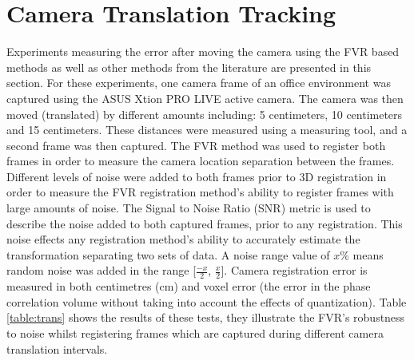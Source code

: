 \section{Camera Translation Tracking}
\label{Sec:CamTransTrackExp}

Experiments measuring the error after moving the camera using the FVR based methods as well as other methods from the literature are presented in this section. For these experiments, one camera frame of an office environment was captured using the ASUS Xtion PRO LIVE active camera. The camera was then moved (translated) by different amounts including: 5 centimeters, 10 centimeters and 15 centimeters. These distances were measured using a measuring tool, and a second frame was then captured. The FVR method was used to register both frames in order to measure the camera location separation between the frames. \\

Different levels of noise were added to both frames prior to 3D registration in order to measure the FVR registration method's ability to register frames with large amounts of noise. The Signal to Noise Ratio (SNR) metric is used to describe the noise added to both captured frames, prior to any registration. This noise effects any registration method's ability to accurately estimate the transformation separating two sets of data. A noise range value of $x$\% means random noise was added in the range [$\frac{-x}{2}$, $\frac{x}{2}$]. Camera registration error is measured in both centimetres (cm) and voxel error (the error in the phase correlation volume without taking into account the effects of quantization). Table \ref{table:trans} shows the results of these tests, they illustrate the FVR's robustness to noise whilst registering frames which are captured during different camera translation intervals. \\

